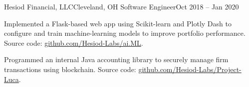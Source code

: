 \begin{ritemize}
	{Hesiod Financial, LLC}{Cleveland, OH}
	{Software Engineer}{Oct 2018 -- Jan 2020}
	\item Implemented a Flask-based web app using Scikit-learn and Plotly Dash to configure and train machine-learning models to improve portfolio performance. Source code: \url{github.com/Hesiod-Labs/ai.ML}.
	\item Programmed an internal Java accounting library to securely manage firm transactions using blockchain. Source code: \url{github.com/Hesiod-Labs/Project-Luca}.
\end{ritemize}